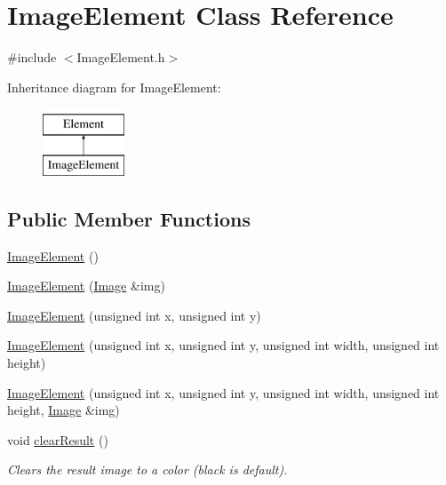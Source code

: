\hypertarget{class_image_element}{\section{Image\-Element Class Reference}
\label{class_image_element}
}


{\ttfamily \#include $<$Image\-Element.\-h$>$}

Inheritance diagram for Image\-Element\-:\begin{figure}[H]
\begin{center}
\leavevmode
\includegraphics[height=2.000000cm]{class_image_element}
\end{center}
\end{figure}
\subsection*{Public Member Functions}
\begin{DoxyCompactItemize}
\item 
\hyperlink{class_image_element_a74aff4a808a295c0557f9c4dbedbc50a}{Image\-Element} ()
\item 
\hyperlink{class_image_element_aba9605d67c75b2802a45e93a4b0cff5d}{Image\-Element} (\hyperlink{class_image}{Image} \&img)
\item 
\hyperlink{class_image_element_a2a1f13235bc96229d3257212b3c62c79}{Image\-Element} (unsigned int x, unsigned int y)
\item 
\hyperlink{class_image_element_a9661aca27d32e6b9252dbbe45417f1bf}{Image\-Element} (unsigned int x, unsigned int y, unsigned int width, unsigned int height)
\item 
\hyperlink{class_image_element_a63993109c5c8e49f95c25ca13a887f1e}{Image\-Element} (unsigned int x, unsigned int y, unsigned int width, unsigned int height, \hyperlink{class_image}{Image} \&img)
\item 
void \hyperlink{class_image_element_aa785ef26786dc59b0e66a71e465b3e31}{clear\-Result} ()
\begin{DoxyCompactList}\small\item\em Clears the result image to a color (black is default). \end{DoxyCompactList}\end{DoxyCompactItemize}
